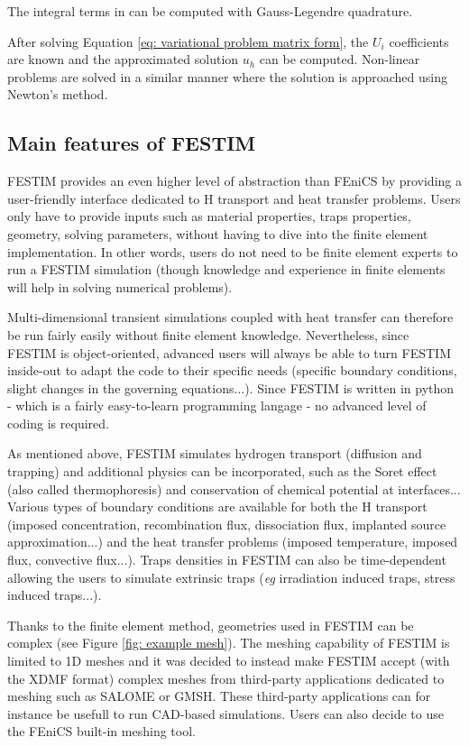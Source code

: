 The integral terms in  can be computed with Gauss-Legendre quadrature.

After solving Equation \ref{eq: variational problem matrix form}, the $U_i$ coefficients are known and the approximated solution $u_h$ can be computed.
Non-linear problems are solved in a similar manner where the solution is approached using Newton's method.

\subsection{Main features of FESTIM}
FESTIM provides an even higher level of abstraction than FEniCS by providing a user-friendly interface dedicated to H transport and heat transfer problems.
Users only have to provide inputs such as material properties, traps properties, geometry, solving parameters, without having to dive into the finite element implementation.
In other words, users do not need to be finite element experts to run a FESTIM simulation (though knowledge and experience in finite elements will help in solving numerical problems).

Multi-dimensional transient simulations coupled with heat transfer can therefore be run fairly easily without finite element knowledge.
Nevertheless, since FESTIM is object-oriented, advanced users will always be able to turn FESTIM inside-out to adapt the code to their specific needs (specific boundary conditions, slight changes in the governing equations...).
Since FESTIM is written in python - which is a fairly easy-to-learn programming langage - no advanced level of coding is required.

As mentioned above, FESTIM simulates hydrogen transport (diffusion and trapping) and additional physics can be incorporated, such as the Soret effect (also called thermophoresis) and conservation of chemical potential at interfaces...
Various types of boundary conditions are available for both the H transport (imposed concentration, recombination flux, dissociation flux, implanted source approximation...) and the heat transfer problems (imposed temperature, imposed flux, convective flux...).
Traps densities in FESTIM can also be time-dependent allowing the users to simulate extrinsic traps (\textit{eg} irradiation induced traps, stress induced traps...).

Thanks to the finite element method, geometries used in FESTIM can be complex (see Figure \ref{fig: example mesh}).
The meshing capability of FESTIM is limited to 1D meshes and it was decided to instead make FESTIM accept (with the XDMF format) complex meshes from third-party applications dedicated to meshing such as SALOME or GMSH.
These third-party applications can for instance be usefull to run CAD-based simulations.
Users can also decide to use the FEniCS built-in meshing tool.

